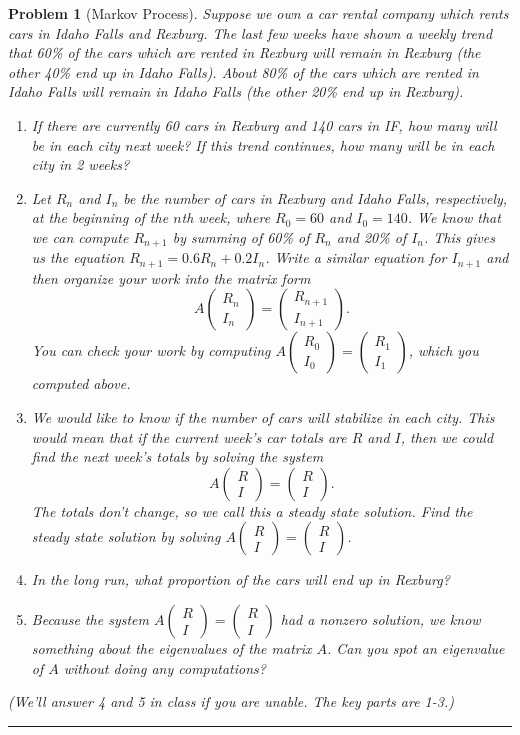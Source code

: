 \documentclass[letterpaper,oneside]{book}%
\theoremstyle{plain}
\theoremstyle{box}
\theoremstyle{problem}
\newtheorem{problemnum}{Problem}[chapter]
\newenvironment{problem}[1][]{\begin{problemnum}[#1]}{\end{problemnum}\nopagebreak\hrule\bigskip}
\newcommand{\pvec}[1]{\begin{pmatrix} #1 \end{pmatrix}}
\begin{document}
\begin{problem}[Markov Process]
Suppose we own a car rental company which rents cars in Idaho Falls and Rexburg. 
The last few weeks have shown a weekly trend that 60\% of the cars which are rented in Rexburg will remain in Rexburg (the other 40\% end up in Idaho Falls). 
About 80\% of the cars which are rented in Idaho Falls will remain in Idaho Falls (the other 20\% end up in Rexburg). 
\begin{enumerate}
 \item If there are currently 60 cars in Rexburg and 140 cars in IF, how many will be in each city next week? If this trend continues, how many will be in each city in 2 weeks?
 \item Let $R_n$ and $I_n$ be the number of cars in Rexburg and Idaho Falls, respectively, at the beginning of the $n$th week, where $R_0=60$ and $I_0=140$. We know that we can compute $R_{n+1}$ by summing of 60\% of $R_n$ and 20\% of $I_n$. This gives us the equation $R_{n+1}=0.6 R_n+0.2I_n$. Write a similar equation for $I_{n+1}$ and then organize your work into the matrix form $$A\pvec{R_{n}\\I_{n}} = \pvec{R_{n+1}\\I_{n+1}}.$$  You can check your work by computing $A\pvec{R_0\\I_0} = \pvec{R_1\\I_1}$, which you computed above.
 \item We would like to know if the number of cars will stabilize in each city. This would mean that if the current week's car totals are $R$ and $I$, then we could find the next week's totals by solving the system $$A\pvec{R\\I} = \pvec{R\\I}.$$  The totals don't change, so we call this a steady state solution. Find the steady state solution by solving $A\pvec{R\\I} = \pvec{R\\I}$. %
 \item In the long run, what proportion of the cars will end up in Rexburg?
 \item Because the system $A\pvec{R\\I} = \pvec{R\\I}$ had a nonzero solution, we know something about the eigenvalues of the matrix $A$.  Can you spot an eigenvalue of $A$ without doing any computations?
\end{enumerate}
(We'll answer 4 and 5 in class if you are unable.  The key parts are 1-3.) 
\end{problem}
\end{document}
